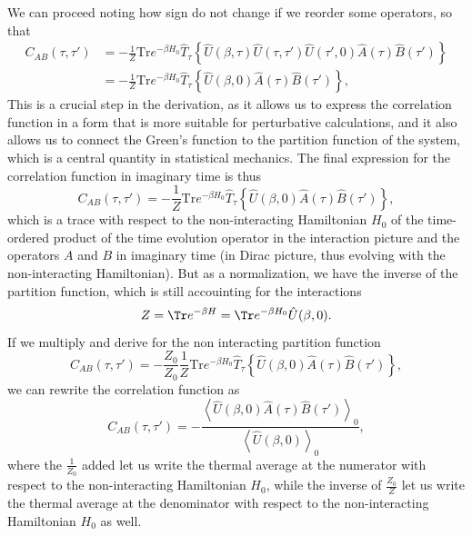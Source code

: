 We can proceed noting how sign do not change if we reorder some operators, so that
\[
    \begin{aligned}
        C_{AB}(\tau, \tau') & = -\frac{1}{Z} \mathrm{Tr} e^{-\beta H_0} \hat{T}_{\tau} \left\{ \hat{U}(\beta, \tau) \hat{U}(\tau, \tau') \hat{U}(\tau', 0)  \hat{A}(\tau) \hat{B}(\tau') \right\} \\
                            & = - \frac{1}{Z} \mathrm{Tr} e^{-\beta H_0} \hat{T}_{\tau} \left\{ \hat{U}(\beta, 0)  \hat{A}(\tau) \hat{B}(\tau') \right\},
    \end{aligned}
\]
This is a crucial step in the derivation, as it allows us to express the correlation function in a form that is more suitable for perturbative calculations, and it also allows us to connect the Green's function to the partition function of the system, which is a central quantity in statistical mechanics. The final expression for the correlation function in imaginary time is thus
\[
    C_{AB}(\tau, \tau') = - \frac{1}{Z} \mathrm{Tr} e^{-\beta H_0} \hat{T}_{\tau} \left\{ \hat{U}(\beta, 0)  \hat{A}(\tau) \hat{B}(\tau') \right\},
\]
which is a trace with respect to the non-interacting Hamiltonian \(H_0\) of the time-ordered product of the time evolution operator in the interaction picture and the operators \(A\) and \(B\) in imaginary time (in Dirac picture, thus evolving with the non-interacting Hamiltonian). But as a normalization, we have the inverse of the partition function, which is still accouinting for the interactions
\[
    Z = \Tr e^{-\beta H} = \Tr e^{-\beta H_0} \hat{U}(\beta, 0).
\]
If we multiply and derive for the non interacting partition function
\[
    C_{AB}(\tau, \tau') = - \frac{Z_0}{Z_0} \frac{1}{Z} \mathrm{Tr} e^{-\beta H_0} \hat{T}_{\tau} \left\{ \hat{U}(\beta, 0)  \hat{A}(\tau) \hat{B}(\tau') \right\},
\]
we can rewrite the correlation function as
\[
    C_{AB}(\tau, \tau') = - \frac{\left\langle \hat{U}(\beta, 0) \hat{A}(\tau) \hat{B}(\tau') \right\rangle_0}{\left\langle \hat{U}(\beta, 0) \right\rangle_0},
\]
where the \(\frac{1}{Z_0}\) added let us write the thermal average at the numerator with respect to the non-interacting Hamiltonian \(H_0\), while the inverse of \(\frac{Z_0}{Z}\) let us write the thermal average at the denominator with respect to the non-interacting Hamiltonian \(H_0\) as well.

